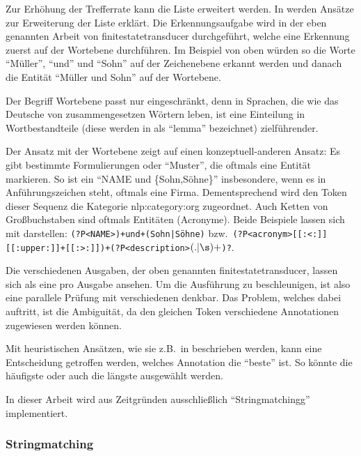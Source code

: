 Zur Erhöhung der Trefferrate
kann die Liste erweitert werden.
In \autocite[Abschnitt 3.4]{OASIcs-LDK-2019-11}
werden Ansätze zur Erweiterung der Liste erklärt.
Die Erkennungsaufgabe wird in der eben genannten Arbeit
von \gls{finitestatetransducer}
durchgeführt,
welche eine Erkennung zuerst auf der Wortebene durchführen.
Im Beispiel von oben würden so die Worte
\enquote{Müller}, \enquote{und} und \enquote{Sohn} auf der Zeichenebene erkannt werden
und danach die Entität \enquote{Müller und Sohn} auf der Wortebene.

Der Begriff Wortebene passt nur eingeschränkt,
denn in Sprachen,
die wie das Deutsche von zusammengesetzen Wörtern leben,
ist eine Einteilung in Wortbestandteile
(diese werden in \autocite{OASIcs-LDK-2019-11} als \foreignquote{english}{lemma} bezeichnet)
zielführender.

Der Ansatz mit der Wortebene zeigt auf einen konzeptuell-anderen Ansatz:
Es gibt bestimmte Formulierungen oder \enquote{Muster},
die oftmals eine Entität markieren.
So ist ein \enquote{NAME und \{Sohn,Söhne\}} insbesondere,
wenn es in Anführungszeichen steht,
oftmals eine Firma.
Dementsprechend wird den Token dieser Sequenz
die Kategorie \gls{nlp:category:org} zugeordnet.
Auch Ketten von Großbuchstaben sind oftmals Entitäten (Acronyme).
Beide Beispiele lassen sich mit  darstellen:
\texttt{(?P<NAME>\w*)\s+und\s+(Sohn|Söhne)}
bzw.\, \texttt{(?P<acronym>[[:<:]][[:upper:]]+[[:>:]])\s+(?P<description>\((.|\s)+\))?}.

Die verschiedenen Ausgaben,
der oben genannten \gls{finitestatetransducer},
lassen sich als eine  pro Ausgabe ansehen.
Um die Ausführung zu beschleunigen,
ist also eine parallele Prüfung mit verschiedenen  denkbar.
Das Problem,
welches dabei auftritt,
ist die Ambiguität,
da den gleichen Token verschiedene Annotationen zugewiesen werden können.

Mit heuristischen Ansätzen,
wie sie z.B.\, in \autocite{1906.01378}
beschrieben werden,
kann eine Entscheidung getroffen werden,
welches Annotation die \enquote{beste} ist.
So könnte die häufigste oder auch die längste ausgewählt werden.

In dieser Arbeit wird aus Zeitgründen ausschließlich \enquote{Stringmatchingg} implementiert.

\subsubsection{Stringmatching}
\label{ssec:stringmatching}

